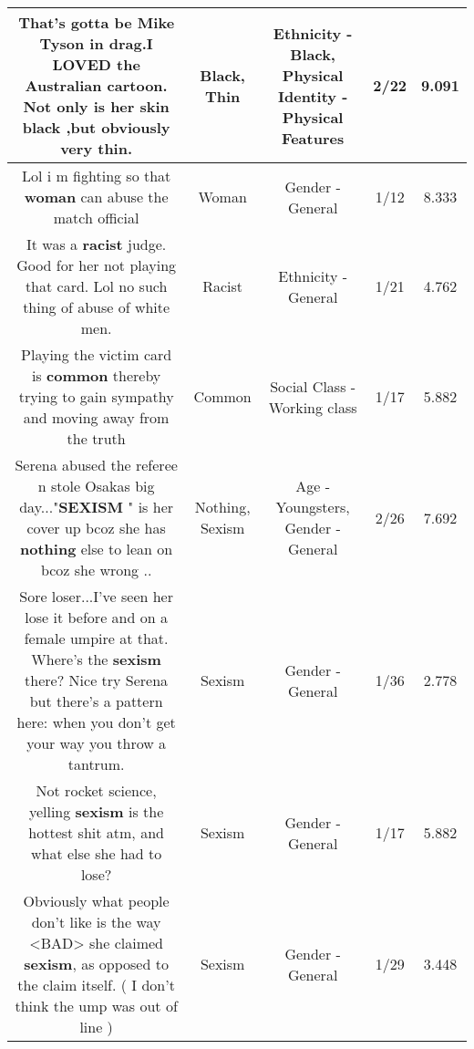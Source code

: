 \documentclass[11pt]{article}
\newlength\mylength
\begin{document}
\begin{center}
\begin{longtable}{|C{.65\mylength}|C{.30\mylength}|C{.12\mylength}|C{.12\mylength}|C{.12\mylength}|}
  \small That's gotta be Mike Tyson in drag.I LOVED the Australian cartoon. Not only is her skin \textbf{black} ,but obviously very \textbf{thin}.\normalsize   & Black, Thin & Ethnicity - Black, Physical Identity - Physical Features & 2/22 & 9.091 \\  \hline
  \small Lol i m fighting so that \textbf{woman} can abuse the match official\normalsize   & Woman & Gender - General & 1/12 & 8.333 \\  \hline
  \small It was a \textbf{racist} judge. Good for her not playing that card. Lol no such thing of abuse of white men.\normalsize   & Racist & Ethnicity - General & 1/21 & 4.762 \\  \hline
  \small Playing the victim card is \textbf{common} thereby trying to gain sympathy and moving away from the truth\normalsize   & Common & Social Class - Working class & 1/17 & 5.882 \\  \hline
  \small Serena abused the referee n stole Osakas big day..."\textbf{SEXISM} " is her cover up bcoz she has \textbf{nothing} else to lean on bcoz she wrong ..\normalsize   & Nothing, Sexism & Age - Youngsters, Gender - General & 2/26 & 7.692 \\  \hline
  \small Sore loser...I've seen her lose it before and on a female umpire at that. Where's the \textbf{sexism} there? Nice try Serena but there's a pattern here: when you don't get your way you throw a tantrum.\normalsize   & Sexism & Gender - General & 1/36 & 2.778 \\  \hline
  \small Not rocket science, yelling \textbf{sexism} is the hottest shit atm, and what else she had to lose?\normalsize   & Sexism & Gender - General & 1/17 & 5.882 \\  \hline
  \small Obviously what people don't like is the way <BAD> she claimed \textbf{sexism}, as opposed to the claim itself. ( I don't think the ump was out of line )\normalsize   & Sexism & Gender - General & 1/29 & 3.448 \\  \hline

\end{longtable}
\end{center}
\end{document}
